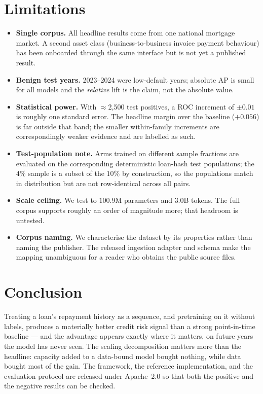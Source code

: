 \documentclass[10pt,letterpaper]{article}
\begin{document}
\section{Limitations}
\label{sec:limitations}
\begin{itemize}
  \item \textbf{Single corpus.} All headline results come from one national mortgage market. A
        second asset class (business-to-business invoice payment behaviour) has been onboarded
        through the same interface but is not yet a published result.
  \item \textbf{Benign test years.} 2023--2024 were low-default years; absolute AP is small for all
        models and the \emph{relative} lift is the claim, not the absolute value.
  \item \textbf{Statistical power.} With $\approx$2{,}500 test positives, a ROC increment of
        $\pm0.01$ is roughly one standard error. The headline margin over the baseline ($+0.056$)
        is far outside that band; the smaller within-family increments are correspondingly weaker
        evidence and are labelled as such.
  \item \textbf{Test-population note.} Arms trained on different sample fractions are evaluated on
        the corresponding deterministic loan-hash test populations; the $4\%$ sample is a subset of
        the $10\%$ by construction, so the populations match in distribution but are not row-identical
        across all pairs.
  \item \textbf{Scale ceiling.} We test to $100.9$M parameters and $3.0$B tokens. The full corpus
        supports roughly an order of magnitude more; that headroom is untested.
  \item \textbf{Corpus naming.} We characterise the dataset by its properties rather than naming the
        publisher. The released ingestion adapter and schema make the mapping unambiguous for a
        reader who obtains the public source files.
\end{itemize}

\section{Conclusion}
Treating a loan's repayment history as a sequence, and pretraining on it without labels, produces a
materially better credit risk signal than a strong point-in-time baseline --- and the advantage
appears exactly where it matters, on future years the model has never seen. The scaling
decomposition matters more than the headline: capacity added to a data-bound model bought nothing,
while data bought most of the gain. The framework, the reference implementation, and the evaluation
protocol are released under Apache~2.0 so that both the positive and the negative results can be
checked.
\end{document}
